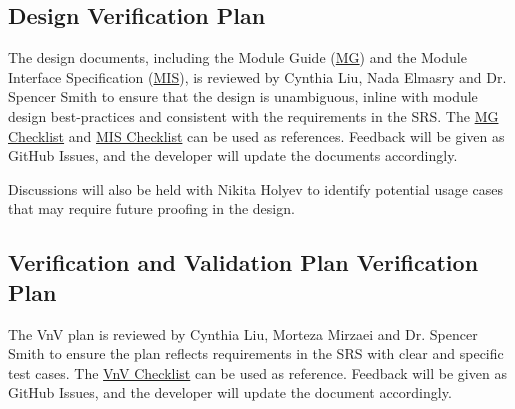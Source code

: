 \documentclass[12pt, titlepage]{article}
\begin{document}

\subsection{Design Verification Plan}

The design documents, including the Module Guide (\href{https://github.com/omltcat/turbulent-flow/blob/main/docs/Design/SoftArchitecture/MG.pdf}{MG}) and the Module Interface Specification (\href{https://github.com/omltcat/turbulent-flow/blob/main/docs/Design/SoftDetailedDes/MIS.pdf}{MIS}), is reviewed by Cynthia Liu, Nada Elmasry and Dr. Spencer Smith to ensure that the design is unambiguous, inline with module design best-practices and consistent with the requirements in the SRS. The \href{https://github.com/omltcat/turbulent-flow/blob/main/docs/Checklists/MG-Checklist.pdf}{MG Checklist} and \href{https://github.com/omltcat/turbulent-flow/blob/main/docs/Checklists/MIS-Checklist.pdf}{MIS Checklist} can be used as references. Feedback will be given as GitHub Issues, and the developer will update the documents accordingly.

Discussions will also be held with Nikita Holyev to identify potential usage cases that may require future proofing in the design.





\subsection{Verification and Validation Plan Verification Plan}

The VnV plan is reviewed by Cynthia Liu, Morteza Mirzaei and Dr. Spencer Smith to ensure the plan reflects requirements in the SRS with clear and specific test cases. The \href{https://github.com/omltcat/turbulent-flow/blob/main/docs/Checklists/VnV-Checklist.pdf}{VnV Checklist} can be used as reference. Feedback will be given as GitHub Issues, and the developer will update the document accordingly.
 


\end{document}
